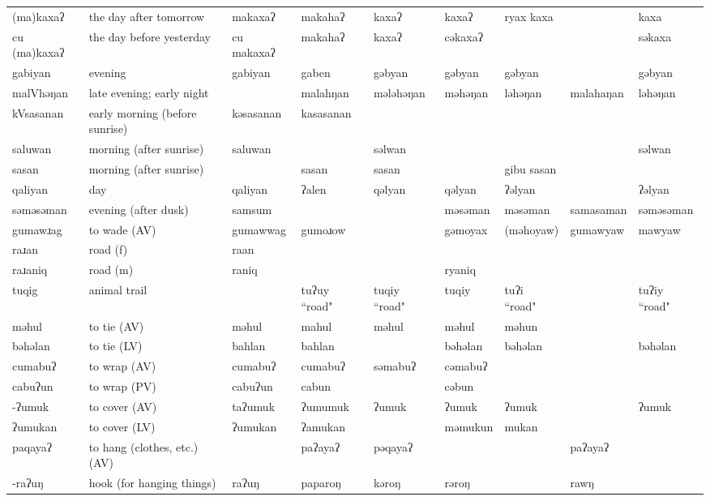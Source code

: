 \begin{landscape}
\begin{longtable}{*{9}{p{}}}
\text{*}(ma)kaxaʔ & the day after tomorrow & makaxaʔ & makahaʔ & kaxaʔ & kaxaʔ & ryax kaxa &  & kaxa\\
\text{*}cu (ma)kaxaʔ & the day before yesterday & cu makaxaʔ & makahaʔ & kaxaʔ & cəkaxaʔ &  &  & səkaxa\\
\text{*}gabiyan & evening & gabiyan & gaben & gəbyan & gəbyan & gəbyan &  & gəbyan\\
\text{*}malVhəŋan & late evening; early night &  & malahŋan & mələhəŋan & məhəŋan & ləhəŋan & malahaŋan & ləhəŋan\\
\text{*}kVsasanan & early morning (before sunrise) & kəsasanan & kasasanan &  &  &  &  & \\
\text{*}saluwan & morning (after sunrise) & saluwan &  & səlwan &  &  &  & səlwan\\
\text{*}sasan & morning (after sunrise) &  & sasan & sasan &  & gibu sasan &  & \\
\text{*}qaliyan & day & qaliyan & ʔalen & qəlyan & qəlyan & ʔəlyan &  & ʔəlyan\\
\text{*}səməsəman & evening (after dusk) & samsum &  &  & məsəman & məsəman & samasaman & səməsəman\\
\text{*}gumawɹag & to wade (AV) & gumawwag & gumoɹow &  & gəmoyax & (məhoyaw) & gumawyaw & mawyaw\\
\text{*}raɹan & road (f) & raan &  &  &  &  &  & \\
\text{*}raɹaniq & road (m) & raniq &  &  & ryaniq &  &  & \\
\text{*}tuqig & animal trail &  & tuʔuy ``road" & tuqiy ``road" & tuqiy & tuʔi ``road" &  & tuʔiy ``road"\\
\text{*}məhul & to tie (AV) & məhul & mahul & məhul & məhul & məhun &  & \\
\text{*}bəhəlan & to tie (LV) & bahlan & bahlan &  & bəhəlan & bəhəlan &  & bəhəlan\\
\text{*}cumabuʔ & to wrap (AV) & cumabuʔ & cumabuʔ & səmabuʔ & cəmabuʔ &  &  & \\
\text{*}cabuʔun & to wrap (PV) & cabuʔun & cabun &  & cəbun &  &  & \\
\text{*}-ʔumuk & to cover (AV) & taʔumuk & ʔumumuk & ʔumuk & ʔumuk & ʔumuk &  & ʔumuk\\
\text{*}ʔumukan & to cover (LV) & ʔumukan & ʔamukan &  & məmukun & mukan &  & \\
\text{*}paqayaʔ & to hang (clothes, etc.) (AV) &  & paʔayaʔ & pəqayaʔ &  &  & paʔayaʔ & \\
\text{*}-raʔuŋ & hook (for hanging things) & raʔuŋ & paparoŋ & kəroŋ & rəroŋ &  & rawŋ & \\

\end{longtable}
\end{landscape}
